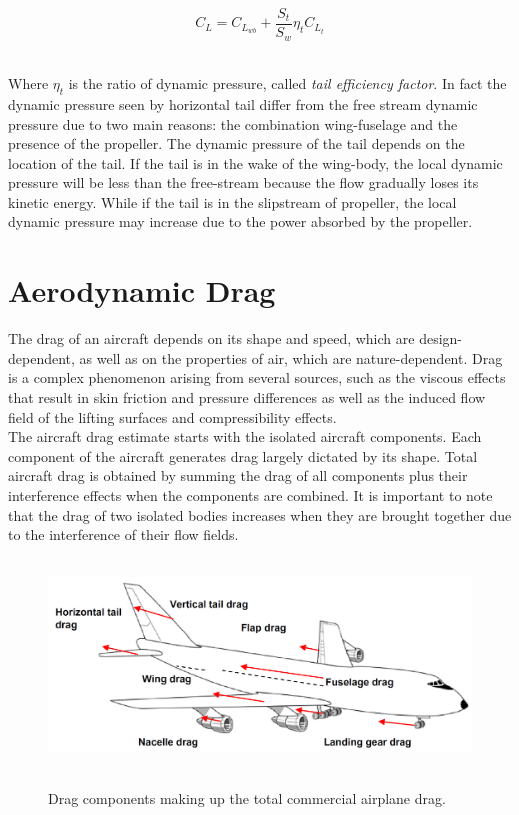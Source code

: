 \begin{equation}
C_L = C_{L_{wb}} + \frac{S_t}{S_w} \eta_t C_{L_{t}}
\end{equation}

\noindent \\ 
Where $\eta_t$ is the ratio of dynamic pressure, called {\itshape tail efficiency factor}. In fact the dynamic pressure seen by horizontal tail differ from the free stream dynamic pressure due to two main reasons: the combination wing-fuselage and the presence of the propeller. The dynamic pressure of the tail depends on the location of the tail. If the tail is in the wake of the wing-body, the local dynamic pressure will be less than the free-stream because the flow gradually loses its kinetic energy. While if the tail is in the slipstream of propeller, the local dynamic pressure may increase due to the power absorbed by the propeller.



\section{Aerodynamic Drag}
The drag of an aircraft depends on its shape and speed, which are design-dependent, as well as on the properties of air, which are nature-dependent. Drag is a complex phenomenon arising from several sources, such as the viscous effects that result in skin friction and pressure differences as well as the induced flow field of the lifting surfaces and compressibility effects. \\
The aircraft drag estimate starts with the isolated aircraft components. Each component of the aircraft generates drag largely dictated by its shape. Total aircraft drag is obtained by summing the drag of all components plus their interference effects when the components are combined. It is important to note that the drag of two isolated bodies increases when they are brought together due to the interference of their flow fields.\cite{kundu}

\begin{figure}[H]
\centering
{\includegraphics[height=5.6cm]{Immagini/dragcomponent.png}} 
\label{drag}
\caption{Drag components making up the total commercial airplane drag.\cite{sforza2014commercial}}
\end{figure} 		

